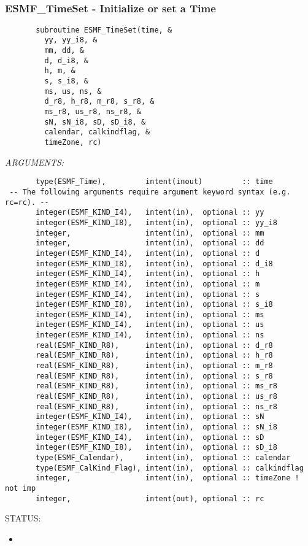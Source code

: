 \mbox{}\hrulefill\ 
 
\subsubsection [ESMF\_TimeSet] {ESMF\_TimeSet - Initialize or set a Time}


 
\begin{verbatim}       subroutine ESMF_TimeSet(time, &
         yy, yy_i8, &
         mm, dd, &
         d, d_i8, &
         h, m, &
         s, s_i8, &
         ms, us, ns, &
         d_r8, h_r8, m_r8, s_r8, &
         ms_r8, us_r8, ns_r8, &
         sN, sN_i8, sD, sD_i8, &
         calendar, calkindflag, &
         timeZone, rc)
 \end{verbatim}{\em ARGUMENTS:}
\begin{verbatim}       type(ESMF_Time),         intent(inout)         :: time
 -- The following arguments require argument keyword syntax (e.g. rc=rc). --
       integer(ESMF_KIND_I4),   intent(in),  optional :: yy
       integer(ESMF_KIND_I8),   intent(in),  optional :: yy_i8
       integer,                 intent(in),  optional :: mm
       integer,                 intent(in),  optional :: dd
       integer(ESMF_KIND_I4),   intent(in),  optional :: d
       integer(ESMF_KIND_I8),   intent(in),  optional :: d_i8
       integer(ESMF_KIND_I4),   intent(in),  optional :: h
       integer(ESMF_KIND_I4),   intent(in),  optional :: m
       integer(ESMF_KIND_I4),   intent(in),  optional :: s
       integer(ESMF_KIND_I8),   intent(in),  optional :: s_i8
       integer(ESMF_KIND_I4),   intent(in),  optional :: ms
       integer(ESMF_KIND_I4),   intent(in),  optional :: us
       integer(ESMF_KIND_I4),   intent(in),  optional :: ns
       real(ESMF_KIND_R8),      intent(in),  optional :: d_r8
       real(ESMF_KIND_R8),      intent(in),  optional :: h_r8
       real(ESMF_KIND_R8),      intent(in),  optional :: m_r8
       real(ESMF_KIND_R8),      intent(in),  optional :: s_r8
       real(ESMF_KIND_R8),      intent(in),  optional :: ms_r8
       real(ESMF_KIND_R8),      intent(in),  optional :: us_r8
       real(ESMF_KIND_R8),      intent(in),  optional :: ns_r8
       integer(ESMF_KIND_I4),   intent(in),  optional :: sN
       integer(ESMF_KIND_I8),   intent(in),  optional :: sN_i8
       integer(ESMF_KIND_I4),   intent(in),  optional :: sD
       integer(ESMF_KIND_I8),   intent(in),  optional :: sD_i8
       type(ESMF_Calendar),     intent(in),  optional :: calendar
       type(ESMF_CalKind_Flag), intent(in),  optional :: calkindflag
       integer,                 intent(in),  optional :: timeZone ! not imp
       integer,                 intent(out), optional :: rc
 \end{verbatim}
{\sf STATUS:}
   \begin{itemize}
   \item{}
   \end{itemize}
  
